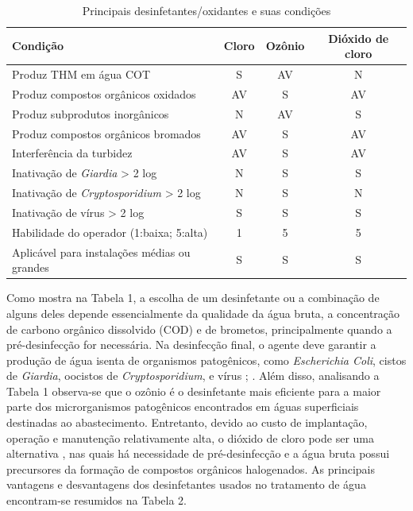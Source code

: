 \begin{table}[!htb]
\begin{center}
\small
\caption{Principais desinfetantes/oxidantes e suas condições}
    \begin{tabular}{l|c|c|c}
    \toprule
        \textbf{Condição}  & \textbf {Cloro} & \textbf{Ozônio} & \textbf{Dióxido de cloro}\\\hline
      Produz THM em água COT   & S & AV & N \\
      Produz compostos orgânicos oxidados & AV & S & AV \\
      Produz subprodutos inorgânicos & N & AV & S \\ 
      Produz compostos orgânicos bromados & AV & S & AV \\ 
      Interferência da turbidez & AV & S & AV \\ 
      Inativação de \textit{Giardia} > 2 log & N & S & S \\ 
      Inativação de \textit{Cryptosporidium} > 2 log & N & S & N \\ 
      Inativação de vírus > 2 log & S & S & S \\ 
      Habilidade do operador (1:baixa; 5:alta) & 1 & 5 & 5 \\ 
      Aplicável para instalações médias ou grandes & S & S & S \\ 
      \bottomrule
    \end{tabular}
    \label{tab01}
\end{center}
\end{table}
Como mostra na Tabela 1, a escolha de um desinfetante ou a combinação de alguns deles depende essencialmente da qualidade da água bruta, a concentração de carbono orgânico dissolvido (COD) e de brometos, principalmente quando a pré-desinfecção for necessária. Na desinfecção final, o agente deve garantir a produção de água isenta de organismos patogênicos, como \textit{Escherichia Coli}, cistos de  \textit{Giardia}, oocistos de \textit{Cryptosporidium}, e vírus \cite{usepa99}; \cite{dibernardo2017}. Além disso, analisando a Tabela 1 observa-se que o ozônio é o desinfetante mais eficiente para a maior parte dos microrganismos patogênicos encontrados em águas superficiais destinadas ao abastecimento. Entretanto, devido ao custo de implantação, operação e manutenção relativamente alta, o dióxido de cloro pode ser uma alternativa , nas quais há necessidade de pré-desinfecção e a água bruta possui precursores da formação de compostos orgânicos halogenados. As principais vantagens e desvantagens dos desinfetantes usados no tratamento de água encontram-se resumidos na Tabela 2.

